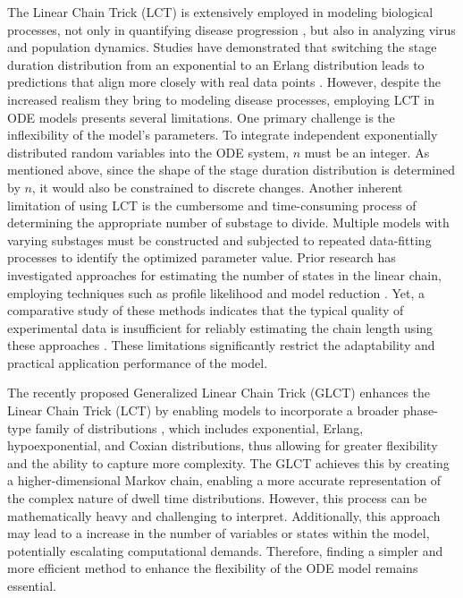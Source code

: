 \documentclass[12pt]{article}
\begin{document}
The Linear Chain Trick (LCT) is extensively employed in modeling biological processes, not only in quantifying disease progression \cite{lloyd2001destabilization}\cite{lloyd2001realistic}, but also in analyzing virus \cite{lloyd2001dependence}\cite{kakizoe2015method} and population \cite{cushing2013integrodifferential} dynamics. Studies have demonstrated that switching the stage duration distribution from an exponential to an Erlang distribution leads to predictions that align more closely with real data points \cite{kakizoe2015method}. However, despite the increased realism they bring to modeling disease processes, employing LCT in ODE models presents several limitations. One primary challenge is the inflexibility of the model's parameters. To integrate independent exponentially distributed random variables into the ODE system, $n$ must be an integer. As mentioned above, since the shape of the stage duration distribution is determined by $n$, it would also be constrained to discrete changes. Another inherent limitation of using LCT is the cumbersome and time-consuming process of determining the appropriate number of substage to divide. Multiple models with varying substages must be constructed and subjected to repeated data-fitting processes to identify the optimized parameter value. Prior research has investigated approaches for estimating the number of states in the linear chain, employing techniques such as profile likelihood \cite{raue2009structural} and model reduction \cite{maiwald2016driving}. Yet, a comparative study of these methods indicates that the typical quality of experimental data is insufficient for reliably estimating the chain length using these approaches \cite{hauber2020estimating}. These limitations significantly restrict the adaptability and practical application performance of the model.

The recently proposed Generalized Linear Chain Trick (GLCT) enhances the Linear Chain Trick (LCT) by enabling models to incorporate a broader phase-type family of distributions \cite{hurtado2019generalizations}\cite{hurtado2021building}\cite{bladt2017phase}, which includes exponential, Erlang, hypoexponential, and Coxian distributions, thus allowing for greater flexibility and the ability to capture more complexity. The GLCT achieves this by creating a higher-dimensional Markov chain, enabling a more accurate representation of the complex nature of dwell time distributions. However, this process can be mathematically heavy and challenging to interpret. Additionally, this approach may lead to a increase in the number of variables or states within the model, potentially escalating computational demands. Therefore, finding a simpler and more efficient method to enhance the flexibility of the ODE model remains essential.
\end{document}
